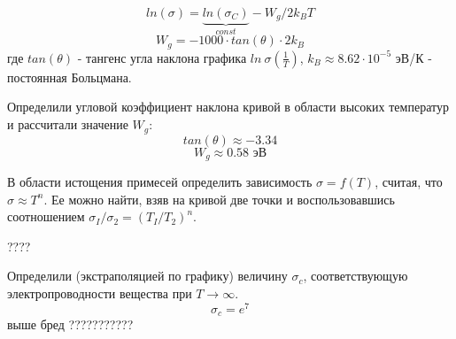 $$ ln(\sigma) = \underbrace{ln(\sigma_C)}_{const} - W_g /2 k_B T $$
$$ W_g = -1000 \cdot tan(\theta) \cdot 2 k_B $$
где $tan(\theta)$ - тангенс угла наклона графика $ln~\sigma(\frac{1}{T})$, $k_B \approx 8.62 \cdot 10^{-5}$ эВ/К -
постоянная Больцмана.

Определили угловой коэффициент наклона кривой в области высоких температур и рассчитали значение $W_g$:
$$tan(\theta) \approx -3.34 $$
$$ W_g \approx 0.58 \text{ эВ}$$ 

В области истощения примесей определить зависимость $\sigma = f(T)$, считая, что $\sigma \approx T^n$. Ее
можно найти, взяв на кривой две точки и воспользовавшись соотношением $\sigma_{I} / \sigma_{2}=\left(T_{I} /
T_{2}\right)^{n}$.

????


Определили (экстраполяцией по графику) величину $\sigma_c$, соответствующую
электропроводности вещества при $T \to \infty$.
$$\sigma_c = e^7 $$
выше бред ???????????




